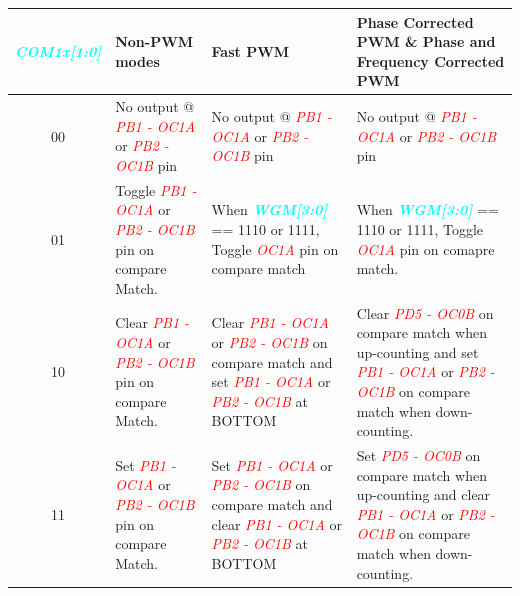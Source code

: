\documentclass{article}
\newcommand{\bitFormat}[1]{\emph{\textbf{\textcolor{cyan}{#1}}}}
\newcommand{\pinFormat}[1]{\emph{\textcolor{red}{#1}}}
\begin{document}
\begin{table}[H]
    \begin{center}
        \begin{tabular}{c|p{4.1cm}|p{4.5cm}|p{4.9cm}}
            \bitFormat{COM1x[1:0]} & \textbf{Non-PWM modes} & \textbf{Fast PWM} & \textbf{Phase Corrected PWM \& Phase and Frequency Corrected PWM}\\
            \hline
            00 & No output @ \pinFormat{PB1 - OC1A} or \pinFormat{PB2 - OC1B} pin &   No output @ \pinFormat{PB1 - OC1A} or \pinFormat{PB2 - OC1B} pin & No output @ \pinFormat{PB1 - OC1A} or \pinFormat{PB2 - OC1B} pin \\
            \hline
            01 &  Toggle \pinFormat{PB1 - OC1A} or \pinFormat{PB2 - OC1B} pin on compare Match. & When \bitFormat{WGM[3:0]} == 1110 or 1111, Toggle \pinFormat{OC1A} pin on compare match & When \bitFormat{WGM[3:0]} == 1110 or 1111, Toggle \pinFormat{OC1A} pin on comapre match.\\
            \hline
            10 & Clear \pinFormat{PB1 - OC1A} or \pinFormat{PB2 - OC1B} pin on compare Match. & Clear \pinFormat{PB1 - OC1A} or \pinFormat{PB2 - OC1B} on compare match and  set \pinFormat{PB1 - OC1A} or \pinFormat{PB2 - OC1B} at BOTTOM & Clear \pinFormat{PD5 - OC0B} on compare match when up-counting and set \pinFormat{PB1 - OC1A} or \pinFormat{PB2 - OC1B} on compare match when down-counting.\\
            \hline
            11 & Set \pinFormat{PB1 - OC1A} or \pinFormat{PB2 - OC1B} pin on compare Match. & Set \pinFormat{PB1 - OC1A} or \pinFormat{PB2 - OC1B} on compare match and clear \pinFormat{PB1 - OC1A} or \pinFormat{PB2 - OC1B} at BOTTOM & Set \pinFormat{PD5 - OC0B} on compare match when up-counting and clear \pinFormat{PB1 - OC1A} or \pinFormat{PB2 - OC1B} on compare match when down-counting.\\
        \end{tabular}
    \end{center}
\end{table}
\end{document}
